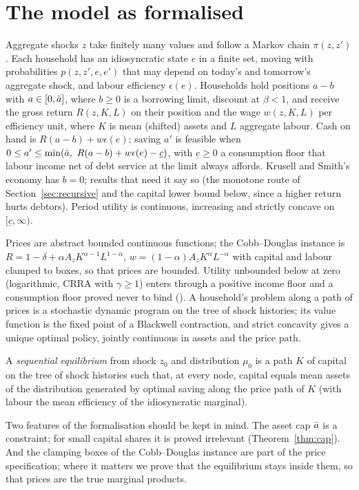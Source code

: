 \section{The model as formalised}\label{sec:model}

Aggregate shocks $z$ take finitely many values and follow a Markov chain $\pi(z,z')$. Each household
has an idiosyncratic state $e$ in a finite set, moving with probabilities $p(z,z',e,e')$ that may
depend on today's and tomorrow's aggregate shock, and labour efficiency $\epsilon(e)$. Households
hold positions $a-b$ with $a\in[0,\bar a]$, where $b\ge0$ is a borrowing limit, discount at
$\beta<1$, and receive the gross return $R(z,K,L)$ on their position and the wage $w(z,K,L)$ per
efficiency unit, where $K$ is mean (shifted) assets and $L$ aggregate labour. Cash on hand is
$R(a-b)+w\epsilon(e)$; saving $a'$ is feasible when
$0\le a'\le\min(\abar,\ R(a-b)+w\epsilon(e)-\underline c)$, with $\underline c\ge 0$ a consumption
floor that labour income net of debt service at the limit always affords. Krusell and Smith's
economy has $b=0$; results that need it say so (the monotone route of
Section~\ref{sec:recursive} and the capital lower bound below, since a higher return hurts
debtors). Period utility is continuous, increasing and strictly concave on
$[\underline c,\infty)$.

Prices are abstract bounded continuous functions; the Cobb--Douglas instance is
$R=1-\delta+\alpha A_zK^{\alpha-1}L^{1-\alpha}$, $w=(1-\alpha)A_zK^\alpha L^{-\alpha}$ with capital
and labour clamped to boxes, so that prices are bounded. Utility unbounded below at zero (logarithmic,
CRRA with $\gamma\ge1$) enters through a positive income floor and a consumption floor proved never
to bind (). A household's problem along a path of prices is a stochastic dynamic
program on the tree of shock histories; its value function is the fixed point of a Blackwell
contraction, and strict concavity gives a unique optimal policy, jointly continuous in assets and the
price path.

\begin{definition}
A \emph{sequential equilibrium} from shock $z_0$ and distribution $\mu_0$ is a path $K$ of capital on
the tree of shock histories such that, at every node, capital equals mean assets of the distribution
generated by optimal saving along the price path of $K$ (with labour the mean efficiency of the
idiosyncratic marginal).
\end{definition}

\noindent
Two features of the formalisation should be kept in mind. The asset cap $\bar a$ is a constraint;
for small capital shares it is proved irrelevant (Theorem~\ref{thm:cap}). And the clamping boxes of the Cobb--Douglas instance are part of the price
specification; where it matters we prove that the equilibrium stays inside them, so that prices are
the true marginal products.

